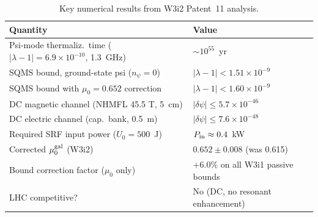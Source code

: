 \documentclass[11pt,twocolumn]{article}
\newcommand{\dpsi}{\delta\psi}
\newcommand{\lam}{\lambda}
\begin{document}
\begin{table}[h!]
\caption{Key numerical results from W3i2 Patent~11 analysis.}
\begin{tabular}{ll}
\toprule
Quantity & Value \\
\midrule
Psi-mode thermaliz.\ time ($|\lam-1|=6.9\times10^{-10}$, 1.3~GHz) & $\sim 10^{55}$~yr \\
SQMS bound, ground-state psi ($n_\psi=0$) & $|\lam-1| < 1.51\times10^{-9}$ \\
SQMS bound with $\mu_0=0.652$ correction & $|\lam-1| < 1.60\times10^{-9}$ \\
DC magnetic channel (NHMFL 45.5 T, 5~cm) & $|\dpsi| \leq 5.7\times10^{-46}$ \\
DC electric channel (cap.\ bank, 0.5~m) & $|\dpsi| \leq 7.6\times10^{-48}$ \\
Required SRF input power ($U_0=500$~J) & $P_{\rm in} \approx 0.4$~kW \\
Corrected $\mu_0^{\rm gal}$ (W3i2) & $0.652\pm0.008$ (was 0.615) \\
Bound correction factor ($\mu_0$ only) & $+6.0\%$ on all W3i1 passive bounds \\
LHC competitive? & No (DC, no resonant enhancement) \\
\bottomrule
\end{tabular}
\end{table}
\end{document}
